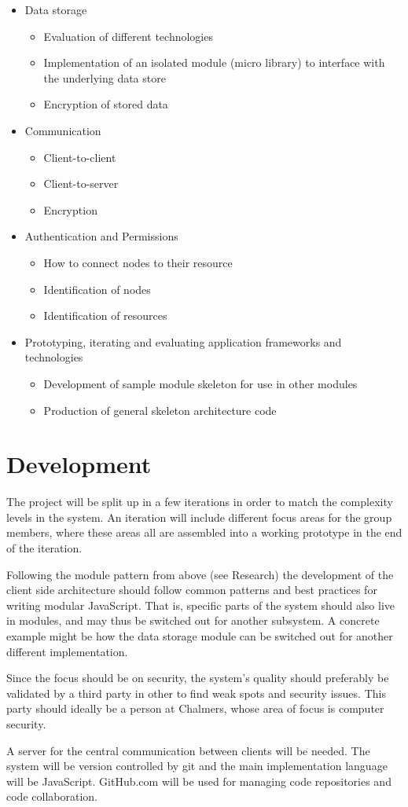 \begin{itemize} 
\item Data storage 
     \begin{itemize} 
        \item Evaluation of different technologies
        \item Implementation of an isolated module (micro library) to interface with the underlying data store
        \item Encryption of stored data
     \end{itemize}
\item Communication
	\begin{itemize} 
        \item Client-to-client 
        \item Client-to-server
        \item Encryption
     \end{itemize}
\item Authentication and Permissions
	\begin{itemize} 
        \item How to connect nodes to their resource
        \item Identification of nodes
        \item Identification of resources
     \end{itemize}
\item Prototyping, iterating and evaluating application frameworks and technologies
\begin{itemize} 
        \item Development of sample module skeleton for use in other modules
        \item Production of general skeleton architecture code
     \end{itemize}
\end{itemize}
\section{Development}
The project will be split up in a few iterations in order to match the complexity levels in the system. An iteration will include different focus areas for the group members, where these areas all are assembled into a working prototype in the end of the iteration. 

Following the module pattern from above (see Research) the development of the client side architecture should follow common patterns and best practices for writing modular JavaScript. That is, specific parts of the system should also live in modules, and may thus be switched out for another subsystem. A concrete example might be how the data storage module can be switched out for another different implementation.

Since the focus should be on security, the system’s quality should preferably be validated by a third party in other to find weak spots and security issues. This party should ideally be a person at Chalmers, whose area of focus is computer security.

A server for the central communication between clients will be needed. The system will be version controlled by git and the main implementation language will be JavaScript. GitHub.com will be used for managing code repositories and code collaboration.